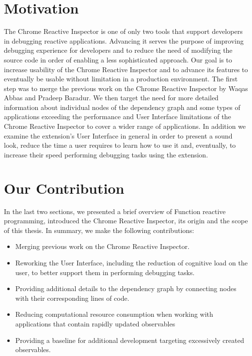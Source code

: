 \section{Motivation}
The Chrome Reactive Inspector is one of only two tools that support developers in debugging reactive applications. Advancing it serves the purpose of improving debugging experience for developers and to reduce the need of modifying the source code in order of enabling a less sophisticated approach. Our goal is to increase usability of the Chrome Reactive Inspector and to advance its features to eventually be usable without limitation in a production environment. The first step was to merge the previous work on the Chrome Reactive Inspector by Waqas Abbas and Pradeep Baradur. We then target the need for more detailed information about individual nodes of the dependency graph and some types of applications exceeding the performance and User Interface limitations of the Chrome Reactive Inspector to cover a wider range of applications. In addition we examine the extension's User Interface in general in order to present a sound look, reduce the time a user requires to learn how to use it and, eventually, to increase their speed performing debugging tasks using the extension.

\section{Our Contribution}

In the last two sections, we presented a brief overview of Function reactive programming, introduced the Chrome Reactive Inspector, its origin and the scope of this thesis.
In summary, we make the following contributions:

\begin{itemize}
	\item Merging previous work on the Chrome Reactive Inspector.
	\item Reworking the User Interface, including the reduction of cognitive load on the user, to better support them in performing debugging tasks.
	\item Providing additional details to the dependency graph by connecting nodes with their corresponding lines of code.
	\item Reducing computational resource consumption when working with applications that contain rapidly updated observables
	\item Providing a baseline for additional development targeting excessively created observables.
\end{itemize}

